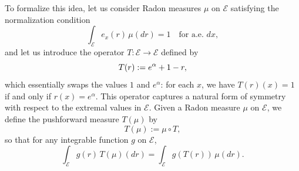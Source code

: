 \documentclass[10pt,a4paper]{amsart}
\begin{document}
To formalize this idea, let us consider Radon measures $\mu$ on $\mathcal{E}$ satisfying the normalization condition
\[
\int_\mathcal{E} e_x(r)\, \mu(dr) = 1 \quad \text{for a.e.\ } dx,
\]
and let us introduce the operator $T: \mathcal{E} \to \mathcal{E}$ defined by
\begin{equation}{\label{eq: def T sym}}
 T(r) := e^\alpha + 1 - r,   
\end{equation}
which essentially swaps the values $1$ and $e^\alpha$: for each $x$, we have $T(r)(x) = 1$ if and only if $r(x) = e^\alpha$. This operator captures a natural form of symmetry with respect to the extremal values in $\mathcal{E}$. Given a Radon measure $\mu$ on $\mathcal{E}$, we define the pushforward measure $T(\mu)$ by
\[
T(\mu) := \mu \circ T,
\]
so that for any integrable function $g$ on $\mathcal{E}$,
\[
\int_\mathcal{E} g(r)\, T(\mu)(dr) = \int_\mathcal{E} g(T(r))\, \mu(dr).
\]
\end{document}
